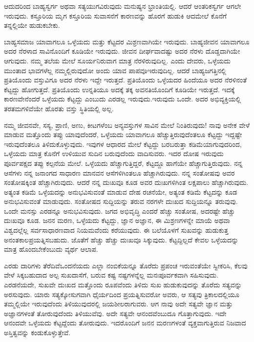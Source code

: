 ಆದುದರಿಂದ ಬಾಹ್ಯಸ್ವರ್ಗ ಅಥವಾ ಸತ್ಯಯುಗವಿರುವುದು ಮನುಷ್ಯನ ಭ್ರಾಂತಿಯಲ್ಲಿ. ಆದರೆ ಆಂತರಿಕಸ್ವರ್ಗ ಆಗಲೇ ಇರುವುದು. ಕಸ್ತೂರಿಯ ಮೃಗ ಕಸ್ತೂರಿಯ ಸುವಾಸನೆಗೆ ಕಾರಣವನ್ನು ಹೊರಗೆ ಹುಡುಕಿ ಆದಮೇಲೆ ಕೊನೆಗೆ ತನ್ನಲ್ಲಿಯೇ ಹುಡುಕಬೇಕು.

ಬಾಹ್ಯಸಮಾಜ ಯಾವಾಗಲೂ ಒಳ್ಳೆಯದು ಮತ್ತು ಕೆಟ್ಟದರ ಮಿಶ್ರಣವಾಗಿಯೇ ಇರುವುದು. ಬಾಹ್ಯಜೀವನ ಯಾವಾಗಲೂ ಅದರ ನೆರಳಾದ ಸಾವಿನೊಂದಿಗೆ ಕೂಡಿಯೇ ಇರುವುದು. ಜೀವನ ದೀರ್ಘವಾದಷ್ಟು ಅದರ ನೆರಳು ದೊಡ್ಡದಾಗಿಯೇ ಆಗುವುದು. ನಮ್ಮ ತಲೆಯ ಮೇಲೆ ಸೂರ್ಯನಿರುವಾಗ ಮಾತ್ರ ನೆರಳಿರುವುದಿಲ್ಲ. ಎಂದು ದೇವರು, ಒಳ್ಳೆಯದು ಮುಂತಾದ ಭಾವಗಳೆಲ್ಲ ನಮ್ಮಲ್ಲಿರುವುದೋ ಅಂದು ಯಾವ ಪಾಪವೂ\break ಇರುವುದಿಲ್ಲ. ಆದರೆ ಬಾಹ್ಯಜಗತ್ತಿನಲ್ಲಿ ಪ್ರತಿಯೊಂದು ವಸ್ತುವಿಗೂ ಅದರ ನೆರಳು ಇದ್ದೇ ಇರುತ್ತದೆ. ಪ್ರತಿಯೊಂದು ಒಳ್ಳೆಯದರ ಹಿಂದೆಯೂ ಅದರ ನೆರಳಿನಂತೆ ಕೆಟ್ಟದ್ದು ಹೋಗು\break ತ್ತದೆ. ಪ್ರತಿಯೊಂದು ಉನ್ನತಿಯೂ ಅದಕ್ಕೆ ತಕ್ಕ ಅವನತಿಯೊಂದಿಗೆ ಕೂಡಿಯೇ ಇರುತ್ತದೆ. ಇದಕ್ಕೆ ಕಾರಣವೇನೆಂದರೆ ಒಳ್ಳೆಯದು ಕೆಟ್ಟದ್ದು ಎಂಬುದು ಎರಡಲ್ಲ ಇರುವುದು.\break ಇರುವುದು ಒಂದೇ. ಅದರ ಅಭಿವ್ಯಕ್ತಿಯಲ್ಲಿ ತರತಮಗಳಿವೆಯೇ ಹೊರತು ವಸ್ತು ಸ್ಥಿತಿಯಲ್ಲಿ ಅಲ್ಲ.

ನಮ್ಮ ಜೀವನವೇ, ಸಸ್ಯ, ಪ್ರಾಣಿ, ಅಣು, ಕೀಟಗಳೆಂಬ ಅನ್ಯವಸ್ತುಗಳ ಸಾವಿನ ಮೇಲೆ ನಿಂತಿರುವುದು! ನಾವು ಅನೇಕ ವೇಳೆ ಮಾಡುವ ಮತ್ತೊಂದು ತಪ್ಪು ಯಾವುದೆಂದರೆ, ಒಳ್ಳೆಯದು ಯಾವಾಗಲೂ ಹೆಚ್ಚುತ್ತಿರುವುದೆಂತಲೂ ಕೆಟ್ಟದ್ದು ಇದ್ದಷ್ಟೇ ಇರುವುದೆಂತಲೂ ತಿಳಿದುಕೊಳ್ಳುವುದು. ಇವುಗಳ ಆಧಾರದ ಮೇಲೆ ಕೆಟ್ಟದ್ದು ಬರಬರುತ್ತಾ ಕಡಿಮೆಯಾಗುವುದರಿಂದ, ಒಳ್ಳೆಯದು ಮಾತ್ರ ಕೊನೆಗೆ ಉಳಿಯುವ ಸುದಿನ ಬರುವುದೆಂದು ವಾದಿಸುವರು. ಇದರ ದೋಷ ಇರುವುದು ಪೂರ್ವಪಕ್ಷದ ತಪ್ಪು ಕಲ್ಪನೆಯ ಮೇಲೆ. ಒಳ್ಳೆಯದು ಹೆಚ್ಚಾಗುತ್ತಿದ್ದರೆ, ಕೆಟ್ಟದ್ದೂ ಹಾಗೆಯೇ ಹೆಚ್ಚಾಗುತ್ತಿರುವುದು. ನನ್ನ ಆಸೆಗಳು ನನ್ನ ಜನಾಂಗದ ಸಾಧಾರಣ ಮಾನವನ ಆಸೆಗಳಿಗಿಂತಲೂ ಹೆಚ್ಚಾಗಿರುವುದು. ನನ್ನ ಸಂತೋಷವು ಅವರ ಸಂತೋಷಕ್ಕಿಂತ ಹೆಚ್ಚಾಗಿರುವುದು. ಆದರೆ ನನ್ನ ದುಃಖವೂ ಕೂಡ ಅವರ ದುಃಖಗಳಿಗಿಂತ ಲಕ್ಷಪಾಲು ಹೆಚ್ಚಾಗಿರುವುದು. ಅತ್ಯಂತ ಕಡಿಮೆ ಒಳ್ಳೆಯದನ್ನು ಅನುಭವಿಸುವಂತೆ ಮಾಡುವ ದೇಹ ರಚನೆಯೇ, ಅತ್ಯಂತ ಕಡಿಮೆ ಕೆಟ್ಟದನ್ನು ಕೂಡ ಅನುಭವಿಸುವಂತೆ ಮಾಡುವುದು. ಸಂತೋಷದ ಸುದ್ದಿಯನ್ನು ತರುವ ನರಗಳೇ ದುಃಖದ ಸುದ್ದಿಯನ್ನೂ ತರುವುವು. ಒಂದೇ ಮನಸ್ಸು ಎರಡನ್ನೂ ಅನುಭವಿಸುವುದು. ಜಗದ ಅಭಿವೃದ್ಧಿ ಎಂದರೆ ಹೆಚ್ಚು ಸಂತೋಷ, ಅದರಷ್ಟೇ ಹೆಚ್ಚು ದುಃಖವೂ ಕೂಡ. ಜನನ ಮರಣ, ಒಳ್ಳೆಯದು ಕೆಟ್ಟದ್ದು, ಜ್ಞಾನ ಅಜ್ಞಾನ, ಈ ಮಿಶ್ರಣಗಳನ್ನೇ ಮಾಯೆ ಅಥವಾ ವಿಶ್ವದಲ್ಲೆಲ್ಲ ಸರ್ವಸಾಧಾರಣವಾದ ನಿಯಮವೆಂದು ಕರೆಯುವುದು. ಈ ಬಲೆಯೊಳಗೆ ಸುಖವನ್ನು ಹುಡುಕುತ್ತ ಅನಂತಕಾಲಪ್ರಯತ್ನಿಸಬಹುದು. ಜೊತೆಗೆ ಹೆಚ್ಚು ಹೆಚ್ಚು ದುಃಖವೂ ಸಿಕ್ಕುವುದು. ಕೆಟ್ಟದ್ದಿಲ್ಲದೆ ಕೇವಲ ಒಳ್ಳೆಯದನ್ನು ಮಾತ್ರ ಹೊಂದಬೇಕೆಂಬುದು ವ್ಯರ್ಥ ಆಲಾಪ.

ಎರಡು ದಾರಿಗಳು ತೆರೆದಿವೆ\enginline{-}ಒಂದನೆಯದು ಎಲ್ಲಾ ನಂಬಿಕೆಯನ್ನೂ ತೊರೆದು ಪ್ರಪಂಚ ಇರುವಂತೆಯೇ ಸ್ವೀಕರಿಸಿ, ಕೆಲವು ವೇಳೆ ಸಿಕ್ಕಬಹುದಾದ ಅಲ್ಪ ಸುಖದಾಸೆಗೆ, ಬರುವ ಕಷ್ಟ ನಷ್ಟಗಳನ್ನೆಲ್ಲ ಮನಃಪೂರ್ವಕವಾಗಿ ಸಹಿಸುವುದು. ಎರಡನೆಯದೇ, ಸುಖವೇ ದುಃಖದ ಮತ್ತೊಂದು ರೂಪವೆಂದು ತಿಳಿದು ಸುಖ ಹುಡುಕುವುದನ್ನು ತೊರೆದು ಸತ್ಯವನ್ನು ಅರಸುವುದು. ಯಾರು ಸತ್ಯಕ್ಕೋಸುಗವಾಗಿ ಧೈರ್ಯದಿಂದ ಪ್ರಯತ್ನಿಸುವರೋ ಅವರು, ಆ ಸತ್ಯವು ತ್ರಿಕಾಲದಲ್ಲಿಯೂ ತಮ್ಮಲ್ಲಿಯೇ ಇರುವುದೆಂದು ತಿಳಿಯುವುದರಲ್ಲಿ ಜಯಶೀಲರಾಗುವರು. ಆಗ ನಾವು ಅದೇ ಸತ್ಯವೇ ಜ್ಞಾನ ಮತ್ತು ಅಜ್ಞಾನಗಳಂತೆ ತೋರುವುದೆಂದು ತಿಳಿಯುವೆವು. ಅದೇ ಸತ್ಯವೇ ಆನಂದವೆಂಬುದೂ ಗೊತ್ತಾಗುವುದು. ಇದೇ ಆನಂದವೇ ಒಳ್ಳೆಯದು ಕೆಟ್ಟದ್ದೆಂದು ತೋರುವುದು. ಇದರೊಂದಿಗೆ ಜನನ ಮರಣಗಳಂತೆ ವ್ಯಕ್ತವಾಗು\break ತ್ತಿರುವ ನಿಜವಾದ ಅಸ್ತಿತ್ವವನ್ನು ಕಂಡುಕೊಳ್ಳುತ್ತೇವೆ.

